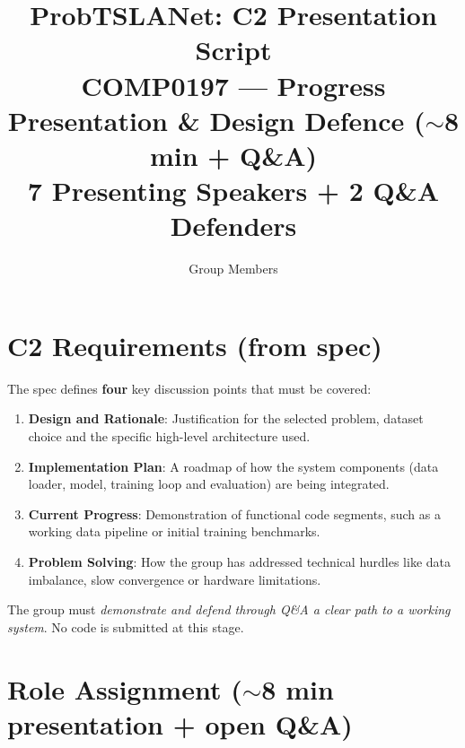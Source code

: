 \documentclass[11pt,a4paper]{article}
\title{\textbf{ProbTSLANet: C2 Presentation Script}\\[4pt]
\large COMP0197 --- Progress Presentation \& Design Defence ($\sim$8 min + Q\&A)\\[3pt]
\normalsize 7 Presenting Speakers + 2 Q\&A Defenders}
\author{Group Members}
\date{}
\begin{document}
\maketitle
\thispagestyle{empty}

\section*{C2 Requirements (from spec)}

The spec defines \textbf{four} key discussion points that must be covered:
\begin{enumerate}[leftmargin=*]
    \item \textbf{Design and Rationale}: Justification for the selected problem, dataset choice and the specific high-level architecture used.
    \item \textbf{Implementation Plan}: A roadmap of how the system components (data loader, model, training loop and evaluation) are being integrated.
    \item \textbf{Current Progress}: Demonstration of functional code segments, such as a working data pipeline or initial training benchmarks.
    \item \textbf{Problem Solving}: How the group has addressed technical hurdles like data imbalance, slow convergence or hardware limitations.
\end{enumerate}

\noindent The group must \emph{demonstrate and defend through Q\&A a clear path to a working system}. No code is submitted at this stage.

\section*{Role Assignment ($\sim$8 min presentation + open Q\&A)}
\end{document}
